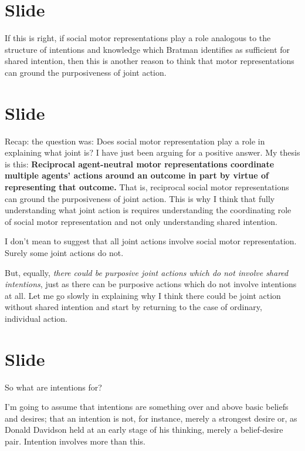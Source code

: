\documentclass[12pt,\papersize]{extarticle}
\begin{document}
\section{Slide}
If this is right, if social motor representations play a role analogous to the structure of intentions and knowledge which Bratman identifies as sufficient for shared intention, then this is another reason to think that motor representations can ground the purposiveness of joint action.



\section{Slide}
Recap: the question was: Does social motor representation  play a role in explaining what joint is?
I have just been arguing for a positive answer.
My thesis is this:
\textbf{Reciprocal agent-neutral motor representations coordinate multiple agents’ actions around an outcome in part by virtue of representing that outcome.}
That is, reciprocal social motor representations can ground the purposiveness of joint action.
This is why I think that fully understanding what joint action is requires understanding the coordinating role of social motor representation and not only understanding shared intention.

I don’t mean to suggest that all joint actions involve social motor representation.  Surely some joint actions do not. 

But, equally, \emph{there could be purposive joint actions which do not involve shared intentions},
just as there can be purposive actions which do not involve intentions at all.
Let me go slowly in explaining why I think there could be joint action without shared intention and start by returning to the case of ordinary, individual action.




\section{Slide}
So what are intentions for?

I’m going to assume that intentions are something over and above basic beliefs and desires; that an intention is not, for instance, merely a strongest desire or, as Donald Davidson held at an early stage of his thinking, merely a belief-desire pair.
Intention involves more than this.
\end{document}
